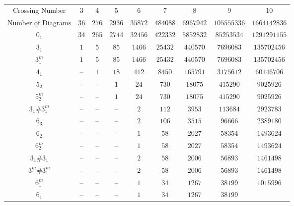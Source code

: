 \documentclass[amsmath,secnumarabic,floatfix,amssymb,nofootinbib,nobibnotes,letterpaper,11pt,tightenlines,showkeys]{revtex4}
\theoremstyle{definition}
\begin{document}
\begin{table}[tp]
\begin{ruledtabular}
\begin{tabular}{ccccccccc}
Crossing Number &
3 & 4 & 5 & 6 & 7 & 8 & 9 & 10 \\
Number of Diagrams &
$\num{36}$ &
$\num{276}$ &
$\num{2936}$ &
$\num{35872}$ &
$\num{484088}$ &
$\num{6967942}$ &
$\num{105555336}$ &
$\num{1664142836}$\\ \hline
$0_1$ &
$\num{34}$ &
$\num{265}$ &
$\num{2744}$ &
$\num{32456}$ &
$\num{422332}$ &
$\num{5852832}$ &
$\num{85253534}$ &
$\num{1291291155}$\\
$3_{1}^{}$ &
$\num{1}$ &
$\num{5}$ &
$\num{85}$ &
$\num{1466}$ &
$\num{25432}$ &
$\num{440570}$ &
$\num{7696083}$ &
$\num{135702456}$\\
$3_{1}^{m}$ &
$\num{1}$ &
$\num{5}$ &
$\num{85}$ &
$\num{1466}$ &
$\num{25432}$ &
$\num{440570}$ &
$\num{7696083}$ &
$\num{135702456}$\\
$4_{1}^{}$ &
-- &
$\num{1}$ &
$\num{18}$ &
$\num{412}$ &
$\num{8450}$ &
$\num{165791}$ &
$\num{3175612}$ &
$\num{60146706}$\\
$5_{2}^{}$ &
-- &
-- &
$\num{1}$ &
$\num{24}$ &
$\num{730}$ &
$\num{18075}$ &
$\num{415290}$ &
$\num{9025926}$\\
$5_{2}^{m}$ &
-- &
-- &
$\num{1}$ &
$\num{24}$ &
$\num{730}$ &
$\num{18075}$ &
$\num{415290}$ &
$\num{9025926}$\\
$3_{1}^{}\#3_{1}^{m}$ &
-- &
-- &
-- &
$\num{2}$ &
$\num{112}$ &
$\num{3953}$ &
$\num{113684}$ &
$\num{2923783}$\\
$6_{3}^{}$ &
-- &
-- &
-- &
$\num{2}$ &
$\num{106}$ &
$\num{3515}$ &
$\num{96666}$ &
$\num{2389180}$\\
$6_{2}^{}$ &
-- &
-- &
-- &
$\num{1}$ &
$\num{58}$ &
$\num{2027}$ &
$\num{58354}$ &
$\num{1493624}$\\
$6_{2}^{m}$ &
-- &
-- &
-- &
$\num{1}$ &
$\num{58}$ &
$\num{2027}$ &
$\num{58354}$ &
$\num{1493624}$\\
$3_{1}^{}\#3_{1}^{}$ &
-- &
-- &
-- &
$\num{2}$ &
$\num{58}$ &
$\num{2006}$ &
$\num{56893}$ &
$\num{1461498}$\\
$3_{1}^{m}\#3_{1}^{m}$ &
-- &
-- &
-- &
$\num{2}$ &
$\num{58}$ &
$\num{2006}$ &
$\num{56893}$ &
$\num{1461498}$\\
$6_{1}^{m}$ &
-- &
-- &
-- &
$\num{1}$ &
$\num{34}$ &
$\num{1267}$ &
$\num{38199}$ &
$\num{1015996}$\\
$6_{1}^{}$ &
-- &
-- &
-- &
$\num{1}$ &
$\num{34}$ &
$\num{1267}$ &
$\num{38199}$ &

\end{tabular}
\end{ruledtabular}
\end{table}
\end{document}
